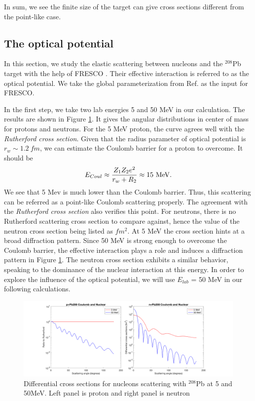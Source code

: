 \documentclass[12pt]{article}
\begin{document}
  		In sum, we see the finite size of the target can give cross sections different from the point-like case.
\subsection{The optical potential}
	In this section, we study the elastic scattering between nucleons and the $^{208}$Pb target with the help of FRESCO\cite{FRESCO} . Their effective interaction is referred to as the optical potential. We take the global parameterization from Ref. \cite{capote2009ripl,koning2003local} as the input for FRESCO.
	
	In the first step, we take two lab energies 5 and 50 MeV in our calculation. The results are shown in Figure \ref{fig:angulardistribution}. It gives the angular distributions in center of mass for protons and neutrons. For the 5 MeV proton, the curve agrees well with the \emph{Rutherford cross section}. Given that the radius parameter of optical potential is $r_w\sim1.2\ fm$, we can estimate the Coulomb barrier for a proton to overcome. It should be 
	\begin{equation}
	E_{Coul}\approx\frac{Z_1Z_2e^2}{r_w+R_2}\approx15\ \rm{MeV}.
	\end{equation}
	We see that 5 Mev is much lower than the Coulomb barrier. Thus, this scattering can be referred as a point-like Coulomb scattering properly. The agreement with the \emph{Rutherford cross section} also verifies this point.
	For neutrons, there is no Rutherford scattering cross section to compare against, hence the value of the neutron cross section being listed as $fm^2$. At 5 MeV the cross section hints at a broad diffraction pattern.
	Since 50 MeV is strong enough to overcome the Coulomb barrier, the effective interaction plays a role and induces a diffraction pattern in Figure \ref{fig:angulardistribution}. The neutron cross section exhibits a similar behavior, speaking to the dominance of the nuclear interaction at this energy. In order to explore the influence of the optical potential, we will use $E_{lab}$ = 50 MeV in our following calculations.
	
	\begin{figure}[t]
	\centering
	\includegraphics[width=1.0\textwidth]{5.png}
	\caption{Differential cross sections for nucleons scattering with $^{208}$Pb at 5 and 50MeV. Left panel is proton and right panel is neutron  }
	\label{fig:angulardistribution}
	\end{figure}
	
\end{document}
